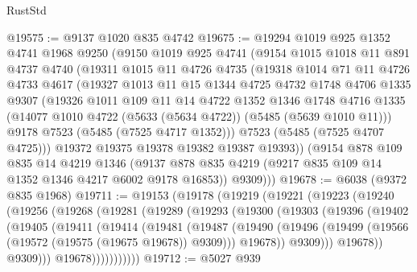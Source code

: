 \begin{lexlean}{RustStd}
\begin{coremodule}
@19575 := @9137 @1020 @835 @4742
@19675 := @19294
    @1019
    @925
    @1352
    @4741
    @1968
    @9250
    (@9150
      @1019
      @925
      @4741
      (@9154
        @1015
        @1018
        @11
        @891
        @4737
        @4740
        (@19311
          @1015
          @11
          @4726
          @4735
          (@19318
            @1014
            @71
            @11
            @4726
            @4733
            @4617
            (@19327
              @1013
              @11
              @15
              @1344
              @4725
              @4732
              @1748
              @4706
              @1335
              @9307
              (@19326
                @1011
                @109
                @11
                @14
                @4722
                @1352
                @1346
                @1748
                @4716
                @1335
                (@14077 @1010 @4722 (@5633 (@5634 @4722)) (@5485 (@5639 @1010 @11)))
                @9178
                @7523
                (@5485 (@7525 @4717 @1352)))
              @7523
              (@5485 (@7525 @4707 @4725)))
            @19372
            @19375
            @19378
            @19382
            @19387
            @19393))
        (@9154
          @878
          @109
          @835
          @14
          @4219
          @1346
          (@9137 @878 @835 @4219 (@9217 @835 @109 @14 @1352 @1346 @4217 @6002 @9178 @16853))
          @9309)))
@19678 := @6038 (@9372 @835 @1968)
@19711 := @19153
    (@19178
      (@19219
        (@19221
          (@19223
            (@19240
              (@19256
                (@19268
                  (@19281
                    (@19289
                      (@19293
                        (@19300
                          (@19303
                            (@19396
                              (@19402
                                (@19405
                                  (@19411
                                    (@19414
                                      (@19481
                                        (@19487
                                          (@19490
                                            (@19496
                                              (@19499
                                                (@19566 (@19572 (@19575 (@19675 @19678)) @9309)))
                                              @19678))
                                          @9309)))
                                    @19678))
                                @9309)))
                          @19678)))))))))))
@19712 := @5027 @939

\end{coremodule}
\end{lexlean}
